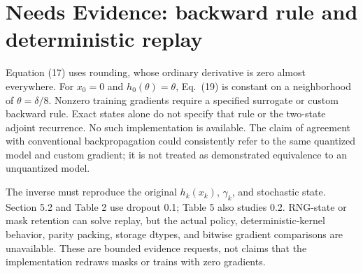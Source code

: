 \documentclass[10pt]{article}
\begin{document}
\section*{Needs Evidence: backward rule and deterministic replay}
Equation (17) uses rounding, whose ordinary derivative is zero almost everywhere. For \(x_0=0\) and \(h_0(\theta)=\theta\), Eq. (19) is constant on a neighborhood of \(\theta=\delta/8\). Nonzero training gradients require a specified surrogate or custom backward rule. Exact states alone do not specify that rule or the two-state adjoint recurrence. No such implementation is available. The claim of agreement with conventional backpropagation could consistently refer to the same quantized model and custom gradient; it is not treated as demonstrated equivalence to an unquantized model.\par
The inverse must reproduce the original \(h_k(x_k)\), \(\gamma_k\), and stochastic state. Section 5.2 and Table 2 use dropout 0.1; Table 5 also studies 0.2. RNG-state or mask retention can solve replay, but the actual policy, deterministic-kernel behavior, parity packing, storage dtypes, and bitwise gradient comparisons are unavailable. These are bounded evidence requests, not claims that the implementation redraws masks or trains with zero gradients.\par
\end{document}

